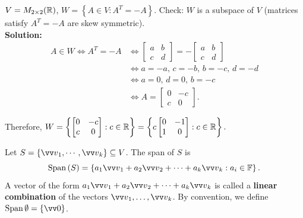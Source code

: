 \begin{example}
    $V = M_{2 \times 2}({\mathbb{R}})$, $W = \left\{  A \in V: A^T = -A \right\}$. Check: $W$ is a subspace of $V$
    (matrices satisfy $A^T = -A$ are skew symmetric).   \\
    \textbf{Solution: } \vspace{-4mm}
    \begin{align*}
        A \in W \iff A^T = -A &\iff
        \begin{bmatrix}
            a & b \\
            c & d
        \end{bmatrix} = -
        \begin{bmatrix}
            a & b \\
            c & d
        \end{bmatrix} \\
                 &\iff a = -a, \, c = -b, \, b = -c, \, d = -d \\
                 &\iff a = 0, \, d = 0, \, b = -c \\
                 &\iff A =
        \begin{bmatrix}
            0 & -c \\
            c & 0
        \end{bmatrix}.
    \end{align*} \vspace{-5mm}
    
    Therefore, $W = 
    \left\{  
        \begin{bmatrix}
            0 & -c \\
            c & 0
        \end{bmatrix}: c \in {\mathbb{R}}
    \right\} = 
    \left\{ c 
        \begin{bmatrix}
            0 & -1 \\
            1 & 0
        \end{bmatrix}: c \in {\mathbb{R}}
    \right\}.$
\end{example}

\begin{definition}
    Let $S = \left\{  \vvv_1, \cdots, \vvv_k \right\} \subseteq V$. The span of $S$ is
    \[\spn{(S)} = \left\{  a_1\vvv_1 + a_2\vvv_2 + \cdots + a_k\vvv_k: a_i \in \F \right\}.\]
    A vector of the form $a_1\vvv_1 + a_2\vvv_2 + \cdots + a_k\vvv_k$ is called a \textbf{linear combination}
    of the vectors $\vvv_1, \ldots, \vvv_k$. By convention, we define $\spn{\emptyset} = \{\vzero\}$.
\end{definition}

